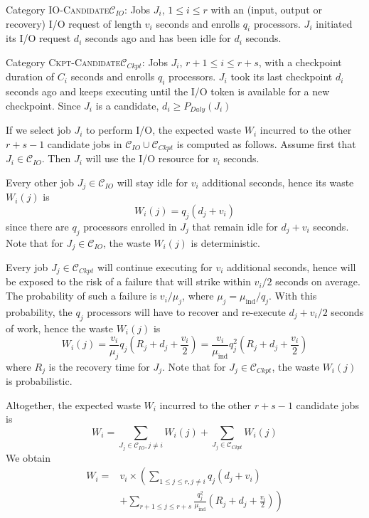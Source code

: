 \documentclass[two]{article}
\newcommand{\muind}{\mu_{\text{ind}}}
\newcommand{\period}[1]{P_{#1}}
\newcommand{\reco}[1]{R_{#1}}
\newcommand{\wap}[1]{W_{#1}}
\newcommand{\wapp}[2]{W_{#1}(#2)}
\newcommand{\IOcat}{\textsc{IO-Candidate}\xspace}
\newcommand{\Ckptcat}{\textsc{Ckpt-Candidate}\xspace}
\newcommand{\Catiocat}{\mathcal{C}_{IO}\xspace}
\newcommand{\Catckptcat}{\mathcal{C}_{Ckpt}\xspace}
\begin{document}
\begin{compactitem}
\item Category \IOcat $\Catiocat$: Jobs $J_{i}$, $1\leq i \leq r$ with an
  (input, output or recovery) I/O request of length $v_{i}$ seconds and enrolls $q_{i}$
  processors. $J_{i}$ initiated its I/O request $d_{i}$ seconds ago and has been idle
  for $d_{i}$ seconds.

\item Category \Ckptcat $\Catckptcat$: Jobs $J_{i}$, $r+1\leq i \leq r+s$,
  with a checkpoint duration of $C_{i}$ seconds and enrolls $q_{i}$ processors.
  $J_{i}$ took its last checkpoint $d_{i}$ seconds ago and keeps executing until the
  I/O token is available for a new checkpoint. Since $J_{i}$ is a candidate,
  $d_{i} \geq \period{Daly}(J_{i})$
\end{compactitem}

If we select job $J_{i}$ to perform I/O, the expected waste $\wap{i}$
incurred to the other $r+s-1$ candidate jobs in  $\Catiocat \cup
\Catckptcat$ is computed as follows. Assume first that $J_{i} \in \Catiocat$.
Then  $J_{i}$ will use the I/O resource for $v_{i}$ seconds.
\begin{compactitem}
%
  \item Every other job $J_{j} \in \Catiocat$ will stay idle for $v_{i}$
  additional seconds, hence its waste $\wapp{i}{j}$ is $$\wapp{i}{j} = q_{j}
  (d_{j} + v_{i})$$ since there are $q_{j}$ processors enrolled in $J_{j}$ that
  remain idle for $d_{j} + v_{i}$ seconds. Note that for $J_{j} \in \Catiocat$, the
  waste $\wapp{i}{j}$ is deterministic.
%
  \item Every job $J_{j} \in \Catckptcat$ will continue executing for
  $v_{i}$ additional seconds, hence will be exposed to the risk of a failure
  that will strike within $v_{i}/2$ seconds on average. The probability of such
  a failure is $v_{i}/\mu_{j}$, where $\mu_{j} =
  \muind/q_{j}$. With this
  probability, the $q_{j}$ processors will have to recover and re-execute $d_{j} +
  v_{i}/2$ seconds of work, hence the waste $\wapp{i}{j}$ is $$\wapp{i}{j} =
  \frac{v_{i}}{\mu_{j} } q_{j} (\reco{j} + d_{j} + \frac{v_{i}}{2}) =
  \frac{v_{i}}{\muind} q^{2}_{j} (\reco{j} + d_{j} + \frac{v_{i}}{2})$$ where
  $\reco{j}$ is the recovery time for $J_{j}$. Note that for $J_{j} \in
  \Catckptcat$, the waste $\wapp{i}{j}$ is probabilistic.
%
 \end{compactitem}
 Altogether, the expected waste $\wap{i}$ incurred
to the other $r+s-1$ candidate jobs is
$$\wap{i} = \sum_{J_{j} \in \Catiocat, j\neq i} \wapp{i}{j} + \sum_{J_{j} \in \Catckptcat} \wapp{i}{j}$$
We obtain
\begin{equation}
\label{eq.selection}
\begin{array}{ll}
 \wap{i} = & v_{i} \times \left( \sum_{1 \leq j \leq r, j\neq i} q_{j} (d_{j} + v_{i}) \right.\\
& + \left. \sum_{r+1 \leq j \leq r+s}   \frac{q^{2}_{j}}{\muind} (\reco{j} + d_{j} + \frac{v_{i}}{2}) \right)
 \end{array}
\end{equation}
\end{document}
